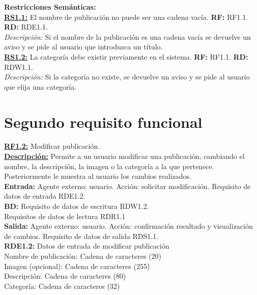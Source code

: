 \textbf{\textcolor{verde}{Restricciones Semánticas:}} \\[6pt]
\textbf{\textcolor{verde}{\underline{RS1.1:}}} El nombre de publicación no puede ser una cadena vacía. \textbf{RF:} RF1.1. \textbf{RD:} RDE1.1. \\
\hspace*{1cm} \textit{Descripción:} Si el nombre de la publicación es una cadena vacía se devuelve un aviso y se pide al 
usuario que introduzca un título. \\[12pt]

\textbf{\textcolor{verde}{\underline{RS1.2:}}} La categoría debe existir previamente en el sistema. \textbf{RF:} RF1.1. \textbf{RD:} RDW1.1. \\
\hspace*{1cm} \textit{Descripción:} Si la categoría no existe, se devuelve un aviso y se pide al 
usuario que elija una categoría.
\newpage

\section{Segundo requisito funcional}
\textbf{\textcolor{rojo}{\underline{RF1.2:}}} Modificar publicación. \\[6pt]

\textbf{\textcolor{rojo}{\underline{Descripción:}}} Permite a un usuario modificar una publicación, 
cambiando el nombre, la descripción, la imagen o la categoría a la que pertenece. Posteriormente le 
muestra al usuario los cambios realizados.\\[6pt]

\textbf{\textcolor{rojo}{Entrada:}} Agente externo: usuario. Acción: solicitar modificación. 
Requisito de datos de entrada \textcolor{azul}{RDE1.2}. \\[6pt]

\textbf{\textcolor{rojo}{BD:}} Requisito de datos de escritura \textcolor{azul}{RDW1.2}.\\ 
\hspace*{1cm}Requisitos de datos de lectura \textcolor{azul}{RDR1.1}\\[6pt]

\textbf{\textcolor{rojo}{Salida:}} Agente externo: usuario. Acción: confirmación resultado y visualización de cambios. 
Requisito de datos de salida \textcolor{azul}{RDS1.1}. \\[12pt]

\textcolor{azul}{\textbf{RDE1.2:}} Datos de entrada de modificar publicación \\
\hspace*{1cm} Nombre de publicación: Cadena de caracteres (20) \\
\hspace*{1cm} Imagen (opcional): Cadena de caracteres (255) \\
\hspace*{1cm} Descripción: Cadena de caracteres (80) \\ 
\hspace*{1cm} Categoría: Cadena de caracteres (32) \\[12pt]

